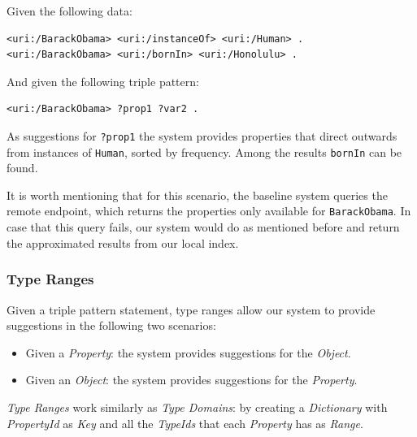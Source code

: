 \begin{example}
Given the following data:
\begin{verbatim}
<uri:/BarackObama> <uri:/instanceOf> <uri:/Human> .
<uri:/BarackObama> <uri:/bornIn> <uri:/Honolulu> .
\end{verbatim}

And given the following triple pattern:
\begin{verbatim}
<uri:/BarackObama> ?prop1 ?var2 .
\end{verbatim}

As suggestions for \texttt{?prop1} the system provides properties that direct outwards from instances of \texttt{Human}, sorted by frequency. Among the results \texttt{bornIn} can be found.

It is worth mentioning that for this scenario, the baseline system queries the remote endpoint, which returns the properties only available for \texttt{BarackObama}. In case that this query fails, our system would do as mentioned before and return the approximated results from our local index.
\end{example}

\subsubsection{Type Ranges}

Given a triple pattern statement, type ranges allow our system to provide suggestions in the following two scenarios:
\begin{itemize}
    \item Given a \textit{Property}: the system provides suggestions for the \textit{Object}.
    \item Given an \textit{Object}: the system provides suggestions for the \textit{Property}.
\end{itemize}

\textit{Type Ranges} work similarly as \textit{Type Domains}: by creating a \textit{Dictionary} with \textit{PropertyId} as \textit{Key} and all the \textit{TypeIds} that each \textit{Property} has as \textit{Range}.

